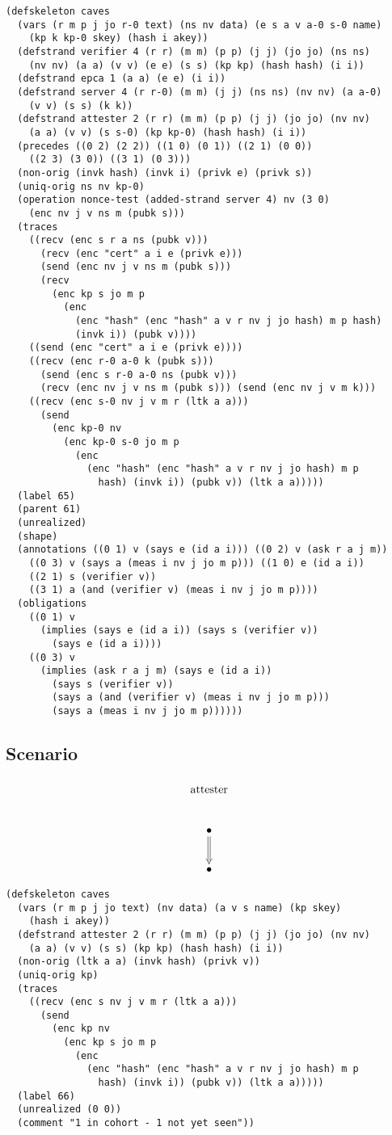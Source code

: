 \documentclass[titlepage,12pt]{article}
\theoremstyle{definition}
\begin{document}
\begin{verbatim}
(defskeleton caves
  (vars (r m p j jo r-0 text) (ns nv data) (e s a v a-0 s-0 name)
    (kp k kp-0 skey) (hash i akey))
  (defstrand verifier 4 (r r) (m m) (p p) (j j) (jo jo) (ns ns)
    (nv nv) (a a) (v v) (e e) (s s) (kp kp) (hash hash) (i i))
  (defstrand epca 1 (a a) (e e) (i i))
  (defstrand server 4 (r r-0) (m m) (j j) (ns ns) (nv nv) (a a-0)
    (v v) (s s) (k k))
  (defstrand attester 2 (r r) (m m) (p p) (j j) (jo jo) (nv nv)
    (a a) (v v) (s s-0) (kp kp-0) (hash hash) (i i))
  (precedes ((0 2) (2 2)) ((1 0) (0 1)) ((2 1) (0 0))
    ((2 3) (3 0)) ((3 1) (0 3)))
  (non-orig (invk hash) (invk i) (privk e) (privk s))
  (uniq-orig ns nv kp-0)
  (operation nonce-test (added-strand server 4) nv (3 0)
    (enc nv j v ns m (pubk s)))
  (traces
    ((recv (enc s r a ns (pubk v)))
      (recv (enc "cert" a i e (privk e)))
      (send (enc nv j v ns m (pubk s)))
      (recv
        (enc kp s jo m p
          (enc
            (enc "hash" (enc "hash" a v r nv j jo hash) m p hash)
            (invk i)) (pubk v))))
    ((send (enc "cert" a i e (privk e))))
    ((recv (enc r-0 a-0 k (pubk s)))
      (send (enc s r-0 a-0 ns (pubk v)))
      (recv (enc nv j v ns m (pubk s))) (send (enc nv j v m k)))
    ((recv (enc s-0 nv j v m r (ltk a a)))
      (send
        (enc kp-0 nv
          (enc kp-0 s-0 jo m p
            (enc
              (enc "hash" (enc "hash" a v r nv j jo hash) m p
                hash) (invk i)) (pubk v)) (ltk a a)))))
  (label 65)
  (parent 61)
  (unrealized)
  (shape)
  (annotations ((0 1) v (says e (id a i))) ((0 2) v (ask r a j m))
    ((0 3) v (says a (meas i nv j jo m p))) ((1 0) e (id a i))
    ((2 1) s (verifier v))
    ((3 1) a (and (verifier v) (meas i nv j jo m p))))
  (obligations
    ((0 1) v
      (implies (says e (id a i)) (says s (verifier v))
        (says e (id a i))))
    ((0 3) v
      (implies (ask r a j m) (says e (id a i))
        (says s (verifier v))
        (says a (and (verifier v) (meas i nv j jo m p)))
        (says a (meas i nv j jo m p))))))
\end{verbatim}

\subsection{Scenario}

$$\xymatrix{
\txt{\strut attester}\\
\bullet\ar@{=>}[d]\\
\bullet}$$

\begin{verbatim}
(defskeleton caves
  (vars (r m p j jo text) (nv data) (a v s name) (kp skey)
    (hash i akey))
  (defstrand attester 2 (r r) (m m) (p p) (j j) (jo jo) (nv nv)
    (a a) (v v) (s s) (kp kp) (hash hash) (i i))
  (non-orig (ltk a a) (invk hash) (privk v))
  (uniq-orig kp)
  (traces
    ((recv (enc s nv j v m r (ltk a a)))
      (send
        (enc kp nv
          (enc kp s jo m p
            (enc
              (enc "hash" (enc "hash" a v r nv j jo hash) m p
                hash) (invk i)) (pubk v)) (ltk a a)))))
  (label 66)
  (unrealized (0 0))
  (comment "1 in cohort - 1 not yet seen"))
\end{verbatim}
\end{document}
